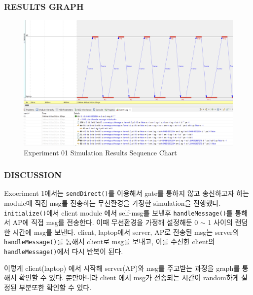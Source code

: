        \subsubsection{RESULTS GRAPH}
            \vspace{-4mm}
            \begin{figure}[!h]\centering 
            	\includegraphics[width=.85\textwidth]{image/week10/1-2.png}
            	\caption{\footnotesize
            	Experiment 01 Simulation Results Sequence Chart}
            	\vspace{-10pt}
            \end{figure}
            \vspace{-4mm}
        \subsubsection{DISCUSSION}
        Exoeriment 1에서는 \texttt{sendDirect()}를 이용해서 gate를 통하지 않고 송신하고자 하는 module에 직접 msg를 전송하는 무선환경을 가정한 simulation을 진행했다. \texttt{initialize()}에서 client module 에서 self-msg를 보낸후 \texttt{handleMessage()}를 통해서 AP에 직접 msg를 전송한다.  이때 무선환경을 가정해 설정해둔 0 $\sim$ 1 사이의 랜덤한 시간에 msg를 보낸다. client, laptop에서 server, AP로 전송된 msg는 server의 \texttt{handleMessage()}를 통해서 client로 msg를 보내고, 이를 수신한 client의 \texttt{handleMessage()}에서 다시 반복이 된다.
        
        이렇게 client(laptop) 에서 시작해 server(AP)와 msg를 주고받는 과정을 graph를 통해서 확인할 수 있다. 뿐만아니라 client 에서 msg가 전송되는 시간이 random하게 설정된 부분또한 확인할 수 있다.
\clearpage